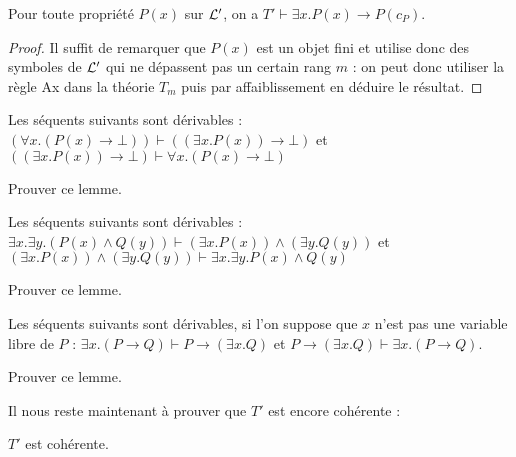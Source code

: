 \begin{lem}
    Pour toute propriété $P(x)$ sur $\mathcal L'$, on a $T'\vdash \exists x.P(x)\to P(c_P)$.
\end{lem}

\begin{proof}
    Il suffit de remarquer que $P(x)$ est un objet fini et utilise donc des symboles de $\mathcal L'$ qui ne dépassent pas un certain rang $m$ : on peut donc utiliser la règle Ax dans la théorie $T_m$ puis par affaiblissement en déduire le résultat.
\end{proof}

\begin{lem}\label{lem:distrib}
    Les séquents suivants sont dérivables : $(\forall x. (P(x)\to \bot)) \vdash ((\exists x. P(x))\to \bot)$ et $((\exists x.P(x))\to \bot)\vdash \forall x. (P(x)\to \bot)$
\end{lem}

\begin{exo}
    Prouver ce lemme.
\end{exo}

\begin{lem}\label{lem:distrand}
    Les séquents suivants sont dérivables : $\exists x.\exists y. (P(x)\land Q(y))\vdash (\exists x.P(x))\land (\exists y.Q(y))$ et $(\exists x.P(x))\land (\exists y.Q(y))\vdash \exists x.\exists y. P(x)\land Q(y)$
\end{lem}

\begin{exo}
    Prouver ce lemme.
\end{exo}

\begin{lem}\label{lem:exidroite}
    Les séquents suivants sont dérivables, si l'on suppose que $x$ n'est pas une variable libre de $P$ : $\exists x.(P\to Q)\vdash P\to (\exists x.Q)$ et $P\to (\exists x.Q)\vdash \exists x.(P\to Q)$.
\end{lem}

\begin{exo}
    Prouver ce lemme.
\end{exo}

Il nous reste maintenant à prouver que $T'$ est encore cohérente :

\begin{prop}[Cohérence de $T'$]
    $T'$ est cohérente.
\end{prop}

